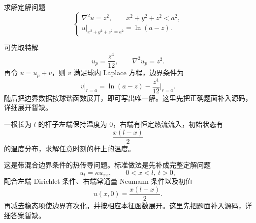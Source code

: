 \begin{question}[原卷第四题（25分）]

求解定解问题
\[
\begin{cases}
\nabla^2 u = z^2,\qquad x^2+y^2+z^2<a^2,\\
\left.u\right|_{x^2+y^2+z^2=a^2}=\ln(a-z).
\end{cases}
\]

\begin{solution}

可先取特解
\[
 u_p=\frac{z^4}{12},\qquad \nabla^2 u_p=z^2.
\]
再令 $u=u_p+v$，则 $v$ 满足球内 Laplace 方程，边界条件为
\[
 v\big|_{r=a}=\ln(a-z)-\frac{z^4}{12}\Big|_{r=a}.
\]
随后把边界数据按球谐函数展开，即可写出唯一解。这里先把正确题面补入源码，详细展开暂缺。


\end{solution}
\end{question}

\begin{question}[原卷第五题（20分）]

一根长为 $l$ 的杆子左端保持温度为 $0$，右端有恒定热流流入，初始状态有
\[
\frac{x(l-x)}{2}
\]
的温度分布，求解任意时刻的杆上的温度。

\begin{solution}

这是带混合边界条件的热传导问题。标准做法是先补成完整定解问题
\[
 u_t=\kappa u_{xx},\qquad 0<x<l,\ t>0,
\]
配合左端 Dirichlet 条件、右端常通量 Neumann 条件以及初值
\[
 u(x,0)=\frac{x(l-x)}{2}.
\]
再减去稳态项使边界齐次化，并按相应本征函数展开。这里先把题面补入源码，详细答案暂缺。


\end{solution}
\end{question}

